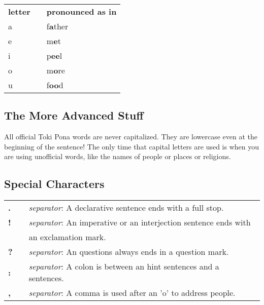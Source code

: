 \begin{supertabular}{p{2cm}|ll}
\textbf{letter}   &&    \textbf{pronounced as in} \\ %
a   &&    f\textbf{a}ther \\ %
e   &&    m\textbf{e}t    \\ %
i   &&    p\textbf{ee}l   \\ %
o   &&    m\textbf{o}re   \\ %
u   &&    f\textbf{oo}d   \\ %
\end{supertabular} 

%
\subsection*{The More Advanced Stuff}
%
All official Toki Pona words are never capitalized. 
They are lowercase even at the beginning of the sentence! 
The only time that capital letters are used is when you are using unofficial words, like the names of people or places or religions. 
%
%
\subsection*{Special Characters}
%

\begin{supertabular}{p{2cm}|ll}
\textbf{.} && \textit{separator}: A declarative sentence ends with a full stop. \\ %
\textbf{!} && \textit{separator}: An imperative or an interjection sentence ends with \\ &&  an exclamation mark. \\ %
\textbf{?} && \textit{separator}: An questions always ends in a question mark. \\ %
\textbf{:} && \textit{separator}: A colon is between an hint sentences and a sentences. \\  %
\textbf{,} && \textit{separator}: A comma is used after an 'o' to address people. \\ %
\end{supertabular} \\

